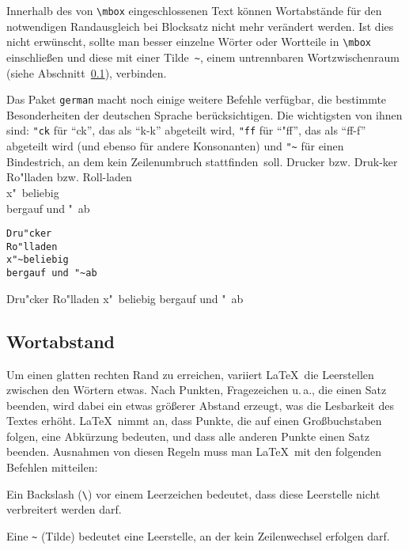 Innerhalb des von \lstinline|\mbox| eingeschlossenen Text können
Wortabstände für den notwendigen Randausgleich bei
Blocksatz nicht mehr verändert werden.  Ist dies nicht
erwünscht, sollte man besser einzelne Wörter oder Wortteile
in \lstinline|\mbox| einschließen und diese mit einer Tilde~\lstinline|~|,
einem untrennbaren Wortzwischenraum (siehe
Abschnitt~\ref{abstaende}), verbinden.


Das Paket \texttt{german} macht noch einige weitere Befehle
verfügbar, die bestimmte Besonderheiten der deutschen Sprache
berücksichtigen.  Die wichtigsten von ihnen sind:
\lstinline|"ck| für "`ck"', das als "`\mbox{k-k}"' abgeteilt wird,
\lstinline|"ff| für "`"ff"', das als "`\mbox{ff-f}"' abgeteilt wird
(und ebenso für andere Konsonanten)
und \lstinline|"~| für einen Bindestrich, an dem kein Zeilenumbruch
stattfinden~soll.
\exa
Drucker bzw. Druk-ker \\
Ro"lladen bzw. Roll-laden \\
x"~beliebig\\
bergauf und "~ab
\exb
\begin{verbatim}
Dru"cker
Ro"lladen
x"~beliebig
bergauf und "~ab
\end{verbatim}
\exc

\begin{LTXexample}
Dru"cker
Ro"lladen
x"~beliebig
bergauf und "~ab
\end{LTXexample}

\subsection{Wortabstand} \label{abstaende}
 
Um einen glatten rechten Rand zu erreichen, variiert \LaTeX\ die
Leerstellen zwischen den Wörtern etwas.
Nach Punkten, Fragezeichen u.\,a., die einen Satz beenden, wird
dabei ein etwas größerer Abstand erzeugt, was die Lesbarkeit
des Textes erhöht.
\LaTeX\ nimmt an, dass Punkte, die auf einen Großbuchstaben
folgen, eine Abkürzung bedeuten, und dass alle anderen Punkte
einen Satz beenden.
Ausnahmen von diesen Regeln muss man \LaTeX\ mit den folgenden
Befehlen mitteilen:

Ein Backslash (\lstinline:\:) vor einem Leerzeichen bedeutet, dass diese
Leerstelle nicht verbreitert werden darf.

Eine \lstinline|~| (Tilde) bedeutet eine Leerstelle,
an der kein Zeilenwechsel erfolgen darf.

